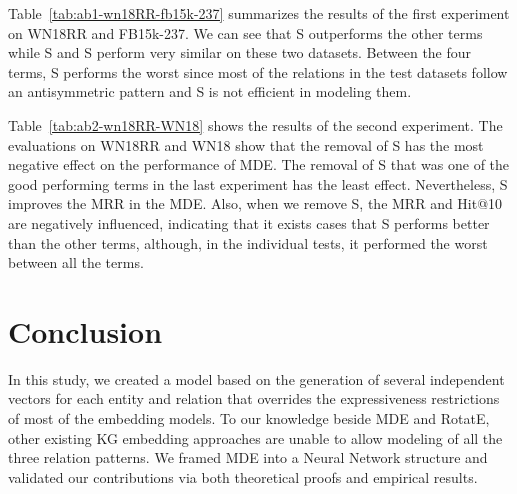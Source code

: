 \documentclass{ecai}
\begin{document}
Table~\ref{tab:ab1-wn18RR-fb15k-237} summarizes the results of the first experiment on WN18RR and FB15k-237. We can see that S outperforms the other terms while S and S perform very similar on these two datasets. Between the four terms, S performs the worst since most of the relations in the test datasets follow an antisymmetric pattern and S is not efficient in modeling them.


\begin{table}\centering
{}
    \caption{Results of MDE after 100 iterations when removing one of the terms. Best results are in bold.}
\label{tab:ab2-wn18RR-WN18}
\end{table}

Table~\ref{tab:ab2-wn18RR-WN18} shows the results of the second experiment. The evaluations on WN18RR and WN18 show that the removal of S has the most negative effect on the performance of MDE. The removal of S that was one of the good performing terms in the last experiment has the least effect. Nevertheless, S improves the MRR in the MDE. Also, when we remove S, the MRR and Hit@10 are negatively influenced, indicating that it exists cases that S performs better than the other terms, although, in the individual tests, it performed the worst between all the terms.




\section{Conclusion}

In this study, we created a model based on the generation of several independent vectors for each entity and relation that overrides the expressiveness restrictions of most of the embedding models.
To our knowledge beside MDE and RotatE, other existing KG embedding approaches are unable to allow modeling of all the three relation patterns.
We framed MDE into a Neural Network structure and validated our contributions via both theoretical proofs and empirical results.
\end{document}
